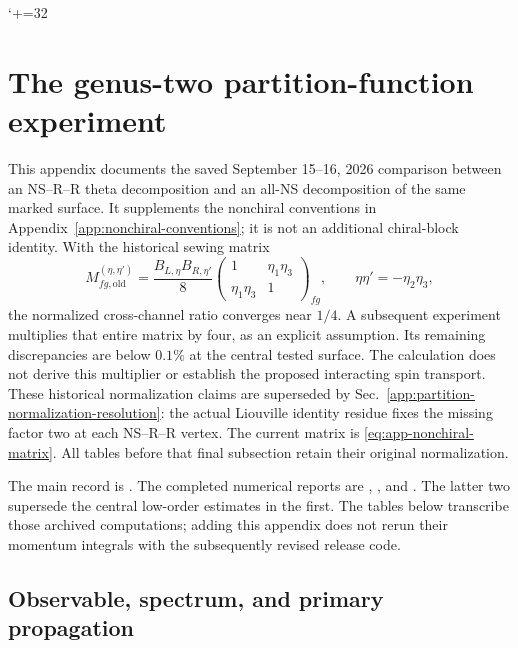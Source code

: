 \clearpage
\begingroup
\makeatletter
\begingroup\lccode`+=32 \lowercase
 {\endgroup\def\Url@ObeySp{\Url@Edit\Url@String{ }{+}}}
\def\Url@space{\penalty\Url@sppen\ }
\makeatother
\section{The genus-two partition-function experiment}
\label{app:partition-test}

This appendix documents the saved September 15--16, 2026 comparison
between an NS--R--R theta decomposition and an all-NS decomposition of
the same marked surface. It supplements the nonchiral conventions in
Appendix~\ref{app:nonchiral-conventions}; it is not an additional
chiral-block identity. With the historical sewing matrix
\begin{equation}
 M_{fg,\mathrm{old}}^{(\eta,\eta')}=
 \frac{B_{L,\eta}B_{R,\eta'}}8
 \begin{pmatrix}1&\eta_1\eta_3\\\eta_1\eta_3&1\end{pmatrix}_{fg},
 \qquad \eta\eta'=-\eta_2\eta_3,
 \label{eq:partition-historical-matrix}
\end{equation}
the normalized cross-channel ratio converges near $1/4$.
A subsequent experiment multiplies that entire
matrix by four, as an explicit assumption. Its remaining discrepancies
are below $0.1\%$ at the central tested surface. The calculation does
not derive this multiplier or establish the proposed interacting spin
transport. These historical normalization claims are superseded by
Sec.~\ref{app:partition-normalization-resolution}: the actual Liouville
identity residue fixes the missing factor two at each NS--R--R vertex.
The current matrix is \eqref{eq:app-nonchiral-matrix}. All tables before
that final subsection retain their original normalization.

The main record is
.
The completed numerical reports are
,
, and
.
The latter two supersede the central low-order estimates in the first.
The tables below transcribe those archived computations; adding this
appendix does not rerun their momentum integrals with the subsequently
revised release code.

\subsection{Observable, spectrum, and primary propagation}

